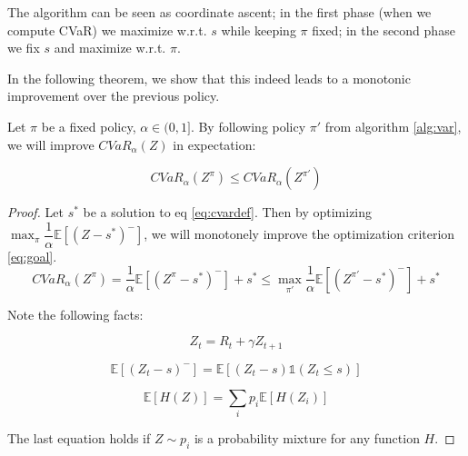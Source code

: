 The algorithm can be seen as coordinate ascent; in the first phase (when we compute CVaR) we maximize w.r.t. $s$ while keeping $\pi$ fixed; in the second phase we fix $s$ and maximize w.r.t. $\pi$.

In the following theorem, we show that this indeed leads to a monotonic improvement over the previous policy.

\begin{theorem}
Let $\pi$ be a fixed policy, $\alpha \in (0, 1]$. By following policy $\pi'$ from algorithm \ref{alg:var}, we will improve $CVaR_\alpha(Z)$ in expectation:

$$CVaR_\alpha(Z^\pi) \le CVaR_\alpha(Z^{\pi'})$$

\end{theorem}

\begin{proof}

Let $s^*$ be a solution to eq \ref{eq:cvardef}. Then by optimizing $\max_\pi \dfrac{1}{\alpha}\mathbb{E}
\left[ (Z-s^*)^-\right]$, we will monotonely improve the optimization criterion \ref{eq:goal}.
$$
CVaR_\alpha(Z^{\pi}) = \dfrac{1}{\alpha}\mathbb{E}
\left[ (Z^\pi-s^*)^-\right] + s^* \le \max_{\pi'}\dfrac{1}{\alpha}\mathbb{E}
\left[ (Z^{\pi'}-s^*)^-\right] + s^*
$$

Note the following facts:

\begin{equation}
Z_t = R_t + \gamma Z_{t+1}
\end{equation}

\begin{equation}
\mathbb{E}\left[(Z_t-s)^-\right] = \mathbb{E}\left[(Z_t-s)\mathbb{1}(Z_t\le s)\right]
\end{equation}

\begin{equation}
\mathbb{E}[H(Z)] = \sum_i p_i \mathbb{E}[H(Z_i)]
\end{equation}

The last equation holds if $Z\sim p_i$ is a probability mixture for any function $H$.


\end{proof}

